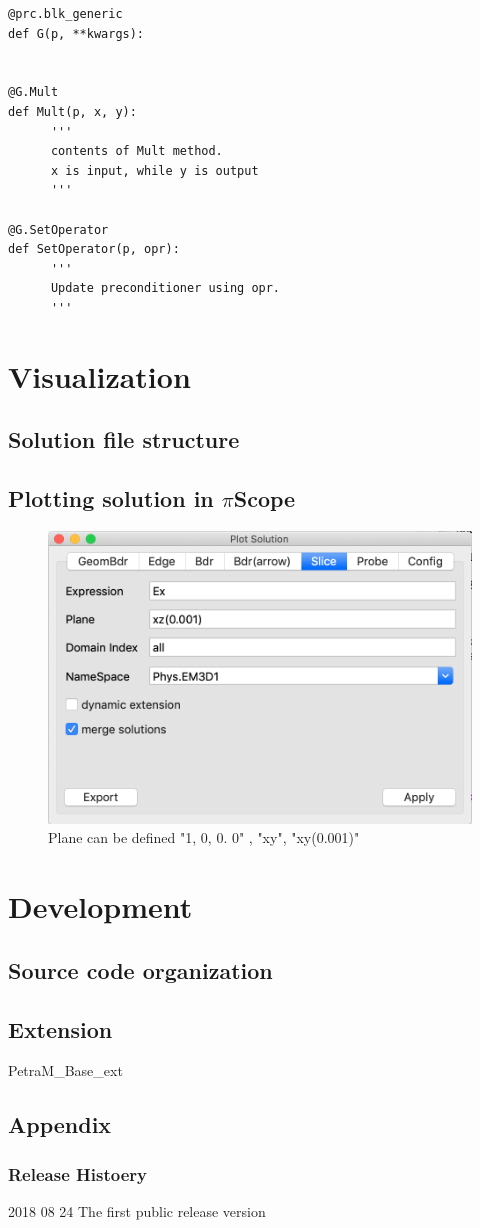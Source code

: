 \documentclass[11pt,a4paper,final]{report}
\begin{document}
\begin{minipage}[c]{0.95\textwidth}
\begin{lstlisting}[caption={A user defined generic preconditioner},captionpos=b, frame=single, label={prc3}]
@prc.blk_generic
def G(p, **kwargs):


@G.Mult
def Mult(p, x, y):
      '''
      contents of Mult method. 
      x is input, while y is output
      '''

@G.SetOperator
def SetOperator(p, opr):
      '''
      Update preconditioner using opr.
      '''
\end{lstlisting}
 \end{minipage}

\chapter{Visualization}
\section{Solution file structure}
\section{Plotting solution in $\pi$Scope}

\begin{figure}
\centering
\includegraphics[width=0.95\columnwidth]{figures/slice_plot.png} 
\caption{ Plane can be defined "1, 0, 0. 0" , "xy", "xy(0.001)" }\label{parametric_scan}
\end{figure}


\chapter{Development}
\section{Source code organization}
\section{Extension}
PetraM\_Base\_ext

\section{Appendix}
\subsection{Release Histoery}

2018 08 24  The first public release version
\end{document}
